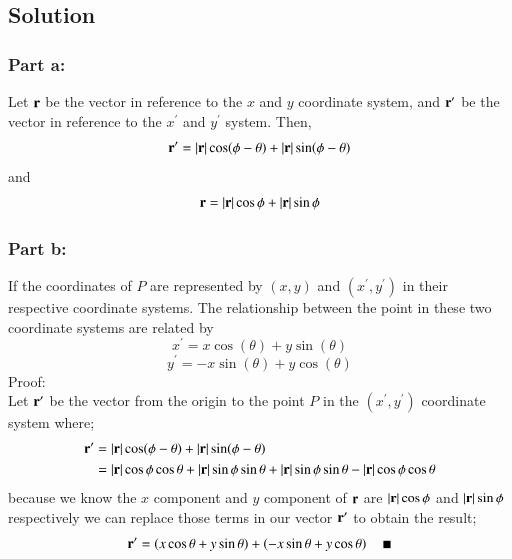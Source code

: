 \documentclass{article}
\begin{document}
\subsection*{Solution}
\subsubsection*{Part a:}
Let $\vb r$ be the vector in reference to the $x$ and $y$ coordinate system, and $\vb r^\prime$ be the vector in reference to the $x^\prime$ and $y^\prime$ system. Then,
\[
	\vb r^\prime = |\vb r| \cos (\phi - \theta) + |\vb r| \sin(\phi - \theta)
\]
and
\[
	\vb r = |\vb r| \cos \phi + |\vb r| \sin \phi
\]
\subsubsection*{Part b:}
If the coordinates of $P$ are represented by $(x,y)$ and $(x^\prime,y^\prime)$ in their respective coordinate systems. The relationship between the point in these two coordinate systems are related by
\[
	x^\prime = x\cos(\theta) + y\sin(\theta)
\]
\[
	y^\prime = -x\sin(\theta) + y\cos(\theta)
\]
Proof:\\
Let $\vb r^\prime$ be the vector from the origin to the point $P$ in the $(x^\prime, y^\prime)$ coordinate system where;
\begin{align*}
	\vb r^\prime &= |\vb r| \cos (\phi - \theta) + |\vb r| \sin(\phi - \theta) \\
		     &= |\vb r| \cos\phi \cos\theta + |\vb r| \sin\phi \sin\theta + |\vb r| \sin\phi \sin\theta - |\vb r| \cos\phi \cos\theta
\end{align*}
because we know the $x$ component and $y$ component of $\vb r$ are $|\vb r|\cos\phi$ and $|\vb r|\sin\phi$ respectively we can replace those terms in our vector $\vb r^\prime$ to obtain the result;
\[
	\vb r^\prime = \left( x\cos\theta + y\sin\theta \right) + \left( -x\sin\theta + y\cos\theta \right) \quad \blacksquare
\]
\end{document}
